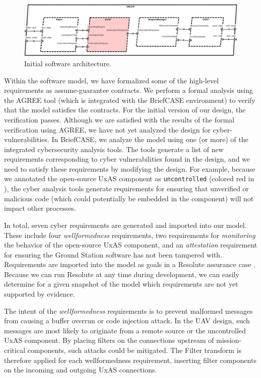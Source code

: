 \begin{figure}[h]
	\centering
	\includegraphics[width=1\columnwidth]{figs/sw-initial.png}
	\caption{Initial software architecture.}
	\label{fig:sw-initial}
\end{figure}

Within the software model, we have formalized some of the high-level requirements as assume-guarantee contracts.  We perform a formal analysis using the AGREE tool (which is integrated with the BriefCASE environment) to verify that the model satisfies the contracts.  For the initial version of our design, the verification passes.
%
Although we are satisfied with the results of the formal verification using AGREE, we have not yet analyzed the design for cyber-vulnerabilities.
In BriefCASE, we analyze the model using one (or more) of the integrated cybersecurity analysis tools.  The tools generate a list of new requirements corresponding to cyber vulnerabilities found in the design,
and we need to satisfy these requirements by modifying the design.
%
For example, because we annotated the open-source UxAS component as \texttt{uncontrolled} (colored red in ), the cyber analysis tools generate requirements for ensuring that unverified or malicious code (which could potentially be embedded in the component) will not impact other processes.

In total, seven cyber requirements are generated and imported into our model.  These include four \textit{wellformedness} requirements, two requirements for \textit{monitoring} the behavior of the open-source UxAS component, and an \textit{attestation} requirement for ensuring the Ground Station software has not been tampered with.  Requirements are imported into the model as goals in a Resolute assurance case \cite{resolute-destion}.  Because we can run Resolute at any time during development, we can easily determine for a given snapshot of the model which requirements are not yet supported by evidence.

The intent of the \textit{wellformedness} requirements is to prevent
malformed messages from causing a buffer overrun or code injection
attack.  In the UAV design, such messages are most likely to originate
from a remote source or the uncontrolled UxAS component.  By placing
filters on the connections upstream of mission-critical components,
such attacks could be mitigated.  The Filter transform is therefore
applied for each wellformedness requirement, inserting filter
components on the incoming and outgoing UxAS connections.

